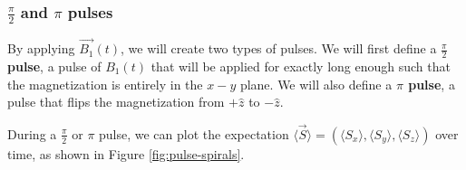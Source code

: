 \documentclass[%
 reprint,
 amsmath,amssymb,
 aps,
]{revtex4-2}
\newcommand{\halfpi}{\frac{\pi}{2}}
\begin{document}
\subsubsection{$\halfpi$ and $\pi$ pulses}

By applying $\vec{B_1}(t)$, we will create two types of pulses. We will first define a \textbf{$\halfpi$ pulse}, a pulse of $B_1(t)$ that will be applied for exactly long enough such that the magnetization is entirely in the $x-y$ plane. We will also define a \textbf{$\pi$ pulse}, a pulse that flips the magnetization from $+\hat{z}$ to $-\hat{z}$. 


During a $\halfpi$ or $\pi$ pulse, we can plot the expectation $\langle \vec{S} \rangle  = (\langle S_x \rangle, \langle S_y \rangle, \langle S_z \rangle)$ over time, as shown in Figure \ref{fig:pulse-spirals}.
\end{document}
